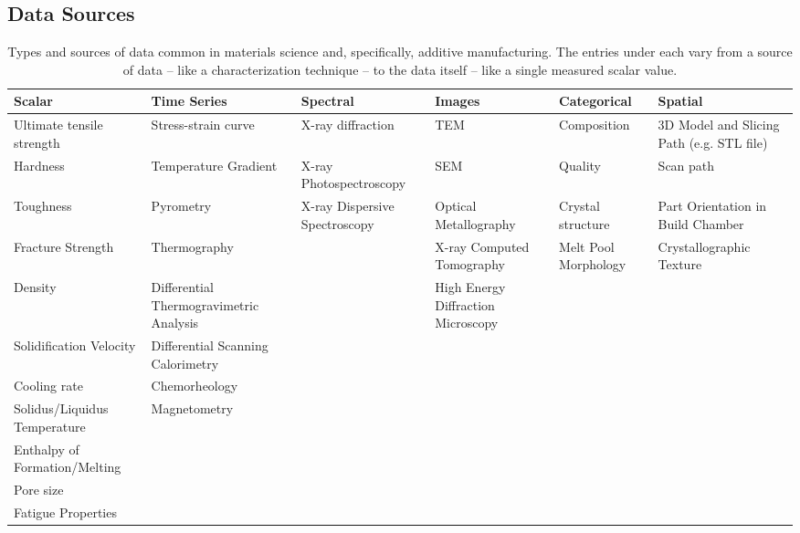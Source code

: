 \subsection{Data Sources}


\renewcommand{\arraystretch}{1.25}
\begin{landscape}
\begin{longtable}{p{2.75cm}p{2.75cm}p{2.75cm}p{2.75cm}p{2.75cm}p{2.75cm}}
		\caption{Types and sources of data common in materials science and, specifically, additive manufacturing. The entries under each vary from a source of data -- like a characterization technique -- to the data itself -- like a single measured scalar value. \label{sources}} \\ 		
		Scalar & Time Series & Spectral & Images & Categorical & Spatial \\ \hline 
		
		\endhead%
\hline

		\raggedright Ultimate tensile strength & Stress-strain curve  & X-ray diffraction & TEM & Composition & 3D Model and Slicing Path (e.g. STL file)\\
		Hardness & Temperature Gradient  & \raggedright X-ray Photospectroscopy  & SEM & Quality & Scan path \\
		
		Toughness & Pyrometry &  \raggedright X-ray Dispersive Spectroscopy & Optical Metallography  & Crystal structure &  Part Orientation in Build Chamber\\
		
		Fracture Strength &Thermography   & & \raggedright X-ray Computed Tomography & \raggedright Melt Pool Morphology & Crystallographic Texture\\
		Density & \raggedright Differential Thermogravimetric Analysis & & High Energy Diffraction Microscopy& & \\
		
		Solidification Velocity & Differential Scanning Calorimetry & & & &\\
		Cooling rate & Chemorheology& & & &\\
		Solidus/Liquidus Temperature & Magnetometry& & & &\\
		\raggedright Enthalpy of Formation/Melting & & & & &\\ 
		Pore size &  & & & & \\
		Fatigue Properties & & & & &\\ \hline
\end{longtable}
\end{landscape}
		
